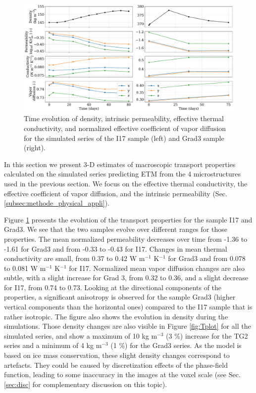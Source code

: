 \documentclass[draft,ms]{agujournal2019}
\begin{document}
\begin{figure}
    \centering
    \includegraphics[width=\linewidth]{Figures/4images_transport_temps_court.pdf}
    \caption{Time evolution of density, intrinsic permeability, effective thermal conductivity, and normalized effective coefficient of vapor diffusion for the simulated series of the I17 sample (left) and Grad3 sample (right). }
    \label{fig:transport_temps}
\end{figure}

In this section we present 3-D estimates of macroscopic transport properties calculated on the simulated series predicting ETM from the 4 microstructures used in the previous section. We focus on the effective thermal conductivity, the effective coefficient of vapor diffusion, and the intrinsic permeability (Sec. \ref{subsec:methode_physical_appli}).

Figure \ref{fig:transport_temps} presents the evolution of the transport properties for the sample I17 and Grad3. We see that the two samples evolve over different ranges for those properties. The mean normalized permeability decreases over time from -1.36 to -1.61 for Grad3 and from -0.33 to -0.43 for I17. Changes in mean thermal conductivity are small, from 0.37 to 0.42 W m$^{-1}$ K$^{-1}$ for Grad3 and from 0.078 to 0.081 W m$^{-1}$ K$^{-1}$ for I17. Normalized mean vapor diffusion changes are also subtle, with a slight increase for Grad 3, from 0.32 to 0.36, and a slight decrease for I17, from 0.74 to 0.73. Looking at the directional components of the properties, a significant anisotropy is observed for the sample Grad3 (higher vertical components than the horizontal ones) compared to the I17 sample that is rather isotropic.
%
The figure also shows the evolution in density during the simulations. Those density changes are also visible in Figure \ref{fig:Tplot} for all the simulated series, and show a maximum of 10 kg m$^{-3}$ (3 \%) increase for the TG2 series and a minimum of 4 kg m$^{-3}$ (1 \%) for the Grad3 series. As the model is based on ice mass conservation, these slight density changes correspond to artefacts. They could be caused by discretization effects of the phase-field function, leading to some inaccuracy in the images at the voxel scale (see Sec. \ref{sec:disc} for complementary discussion on this topic).
\end{document}
